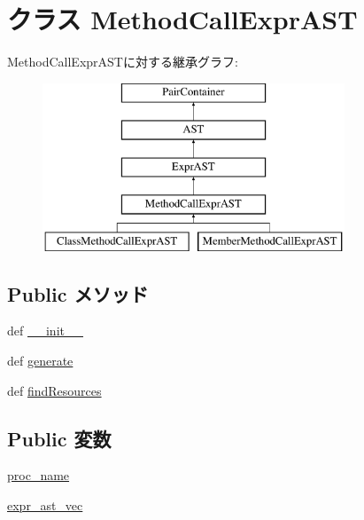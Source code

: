 \hypertarget{classslicc_1_1ast_1_1MethodCallExprAST_1_1MethodCallExprAST}{
\section{クラス MethodCallExprAST}
\label{classslicc_1_1ast_1_1MethodCallExprAST_1_1MethodCallExprAST}
}
MethodCallExprASTに対する継承グラフ:\begin{figure}[H]
\begin{center}
\leavevmode
\includegraphics[height=5cm]{classslicc_1_1ast_1_1MethodCallExprAST_1_1MethodCallExprAST}
\end{center}
\end{figure}
\subsection*{Public メソッド}
\begin{DoxyCompactItemize}
\item 
def \hyperlink{classslicc_1_1ast_1_1MethodCallExprAST_1_1MethodCallExprAST_ac775ee34451fdfa742b318538164070e}{\_\-\_\-init\_\-\_\-}
\item 
def \hyperlink{classslicc_1_1ast_1_1MethodCallExprAST_1_1MethodCallExprAST_a4555d1cee0dccf3942ea35fe86de2e8e}{generate}
\item 
def \hyperlink{classslicc_1_1ast_1_1MethodCallExprAST_1_1MethodCallExprAST_abd195c795639b490ba2de4c1246105f1}{findResources}
\end{DoxyCompactItemize}
\subsection*{Public 変数}
\begin{DoxyCompactItemize}
\item 
\hyperlink{classslicc_1_1ast_1_1MethodCallExprAST_1_1MethodCallExprAST_a314cb734bd4ff35f0428eef1257546cf}{proc\_\-name}
\item 
\hyperlink{classslicc_1_1ast_1_1MethodCallExprAST_1_1MethodCallExprAST_a879a94b10bf090b55af8ec5b4ff4a8d3}{expr\_\-ast\_\-vec}
\end{DoxyCompactItemize}



